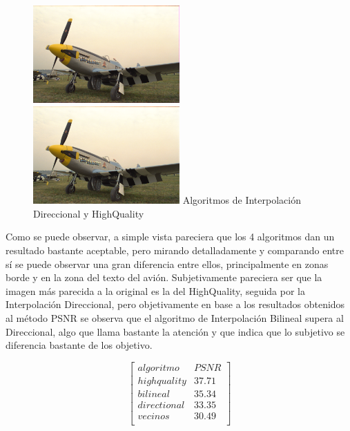 {\begin{figure}

       \includegraphics[width=0.5\textwidth]{imagenes/img9_demosicing_spline.png}
           \hfill
        \includegraphics[width=0.5\textwidth]{imagenes/img9_demosicing_quality.png}
        Algoritmos de Interpolación Direccional y HighQuality
\end{figure}

Como se puede observar, a simple vista pareciera que los 4 algoritmos dan un resultado bastante aceptable, pero mirando detalladamente y comparando entre sí se puede observar una gran diferencia entre ellos, principalmente en zonas borde y en la zona del texto del avión. Subjetivamente pareciera ser que la imagen más parecida a la original es la del HighQuality, seguida por la Interpolación Direccional, pero objetivamente en base a los resultados obtenidos al método PSNR se observa que el algoritmo de Interpolación Bilineal supera al Direccional, algo que llama bastante la atención y que indica que lo subjetivo se diferencia bastante de los objetivo. 

$$ 
\begin{bmatrix}
        algoritmo   &      PSNR     \\
       highquality    &   37.71  \\
       bilineal    &     35.34  \\
       directional    &      33.35    \\
       vecinos   &      30.49     \\
\end{bmatrix} 
$$

}
